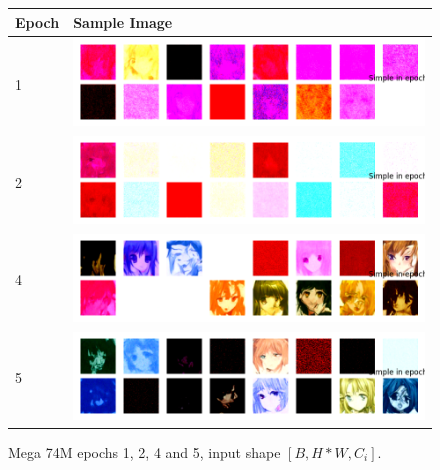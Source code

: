 \documentclass[twocolumn,superscriptaddress,aps]{revtex4-1}
\begin{document}
\begin{figure}[H]
    \centering
    \label{fig:mega_74m_samples}
    \renewcommand{\arraystretch}{1}
    \setlength{\tabcolsep}{2pt}
    \begin{tabular}{@{}p{0.8cm}|p{}@{}}
        \textbf{Epoch} & \textbf{Sample Image} \\
        \hline
        1 & \includegraphics[width=\linewidth]{figures/mega_unet_ddpm_74M_ckpt_epoch_1_epoch_1_samples.png} \\
        2 & \includegraphics[width=\linewidth]{figures/mega_unet_ddpm_74M_ckpt_epoch_2_epoch_2_samples.png} \\
        4 & \includegraphics[width=\linewidth]{figures/mega_unet_ddpm_74M_ckpt_epoch_4_epoch_4_samples.png} \\
        5 & \includegraphics[width=\linewidth]{figures/mega_unet_ddpm_74M_ckpt_epoch_5_epoch_5_samples.png} \\
    \end{tabular}
    \caption{Mega 74M epochs 1, 2, 4 and 5, input shape $[B, H*W, C_i]$.}
\end{figure}
\end{document}

